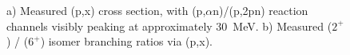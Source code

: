 




\begin{figure}
    \centering
    \caption{a) Measured (p,x) cross section, with (p,$\alpha$n)/(p,2pn) reaction channels visibly peaking at approximately \mbox{30 MeV}.   b) Measured   ($2^+$) /   ($6^+$)  isomer branching ratios via (p,x).} 
     \label{fig:discussion_52Mn}
\end{figure}


